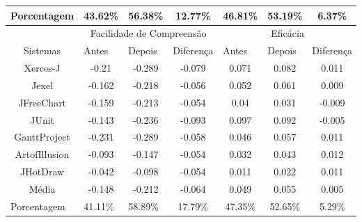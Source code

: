 \begin{table}[h]
\begin{tabular}{c|l|l|l|l|l|l|}
\multicolumn{1}{|l|}{Porcentagem}   & 43.62\%       & 56.38\%       &\multicolumn{1}{c|}{12.77\%}                & 46.81\%   & 53.19\%   & \multicolumn{1}{c|}{6.37\%}\\ \hline
                                    & \multicolumn{3}{c|}{Facilidade de Compreensão} & \multicolumn{3}{c|}{Eficácia}      \\ \hline
\multicolumn{1}{|c|}{Sistemas}      & Antes         & Depois        & Diferença      & Antes     & Depois    & Diferença  \\ \hline
\multicolumn{1}{|c|}{Xerces-J}      & \multicolumn{1}{c|}{-0.21}& \multicolumn{1}{c|}{-0.289}          &\multicolumn{1}{c|}{-0.079}&\multicolumn{1}{c|}{0.071}&\multicolumn{1}{c|}{0.082}&\multicolumn{1}{c|}{0.011}            \\ \hline
\multicolumn{1}{|c|}{Jexel}         & \multicolumn{1}{c|}{-0.162}          & \multicolumn{1}{c|}{-0.218}          &\multicolumn{1}{c|}{-0.056} & \multicolumn{1}{c|}{0.052}          & \multicolumn{1}{c|}{0.061}          &\multicolumn{1}{c|}{0.009}            \\ \hline
\multicolumn{1}{|c|}{JFreeChart}    & \multicolumn{1}{c|}{-0.159}          & \multicolumn{1}{c|}{-0.213} &\multicolumn{1}{c|}{-0.054}&\multicolumn{1}{c|}{0.04}&\multicolumn{1}{c|}{0.031}&\multicolumn{1}{c|}{-0.009}\\ \hline
\multicolumn{1}{|c|}{JUnit}        & \multicolumn{1}{c|}{-0.143}          & \multicolumn{1}{c|}{-0.236}          &\multicolumn{1}{c|}{-0.093}&\multicolumn{1}{c|}{0.097}&\multicolumn{1}{c|}{0.092}&\multicolumn{1}{c|}{-0.005}\\ \hline
\multicolumn{1}{|c|}{GanttProject}  & \multicolumn{1}{c|}{-0.231}          & \multicolumn{1}{c|}{-0.289}          &\multicolumn{1}{c|}{-0.058}&\multicolumn{1}{c|}{0.046}&\multicolumn{1}{c|}{0.057}&\multicolumn{1}{c|}{0.011}\\ \hline
\multicolumn{1}{|c|}{ArtofIllusion} & \multicolumn{1}{c|}{-0.093}          & \multicolumn{1}{c|}{-0.147}          &\multicolumn{1}{c|}{-0.054}&\multicolumn{1}{c|}{0.032}&\multicolumn{1}{c|}{0.043}&\multicolumn{1}{c|}{0.012}\\ \hline
\multicolumn{1}{|c|}{JHotDraw}             & \multicolumn{1}{c|}{-0.042}          & \multicolumn{1}{c|}{-0.098}          &\multicolumn{1}{c|}{-0.054}&\multicolumn{1}{c|}{0.011}&\multicolumn{1}{c|}{0.022}&\multicolumn{1}{c|}{0.011}\\ \hline
\multicolumn{1}{|c|}{Média}         & \multicolumn{1}{c|}{-0.148}         & \multicolumn{1}{c|}{-0.212}         &\multicolumn{1}{c|}{-0.064}&\multicolumn{1}{c|}{0.049}&\multicolumn{1}{c|}{0.055}&\multicolumn{1}{c|}{0.005}\\ \hline
\multicolumn{1}{|l|}{Porcentagem}   & 41.11\%       & 58.89\%       &\multicolumn{1}{c|}{17.79\%}&  \multicolumn{1}{c|}{47.35\%}  &  \multicolumn{1}{c|}{52.65\%}  &\multicolumn{1}{c|}{5.29\%}\\ \hline
\end{tabular}
\end{table}

